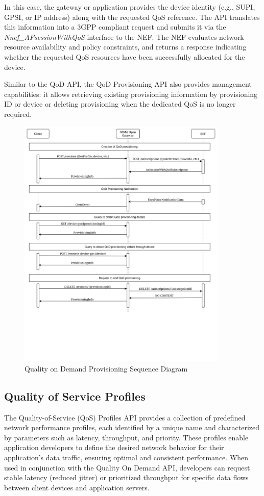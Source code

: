 In this case, the gateway or application provides the device identity (e.g., SUPI, GPSI, or IP address) along with the requested QoS reference. The API translates this information into a 3GPP compliant request and submits it via the \emph{Nnef\_AFsessionWithQoS} interface to the NEF. The NEF evaluates network resource availability and policy constraints, and returns a response indicating whether the requested QoS resources have been successfully allocated for the device.

Similar to the QoD API, the QoD Provisioning API also provides management capabilities: it allows retrieving existing provisioning information by provisioning ID or device or deleting provisioning when the dedicated QoS is no longer required.


\begin{figure}[H]
	\centerline{
		\includegraphics[width=10cm]{figs/QoD_prov_sequence_diagram.png}
	}
	\caption{Quality on Demand Provisioning Sequence Diagram}
\end{figure}

\subsection{Quality of Service Profiles}

The Quality-of-Service (QoS) Profiles API provides a collection of predefined network performance profiles, each identified by a unique name and characterized by parameters such as latency, throughput, and priority. These profiles enable application developers to define the desired network behavior for their application's data traffic, ensuring optimal and consistent performance. When used in conjunction with the Quality On Demand API, developers can request stable latency (reduced jitter) or prioritized throughput for specific data flows between client devices and application servers.

